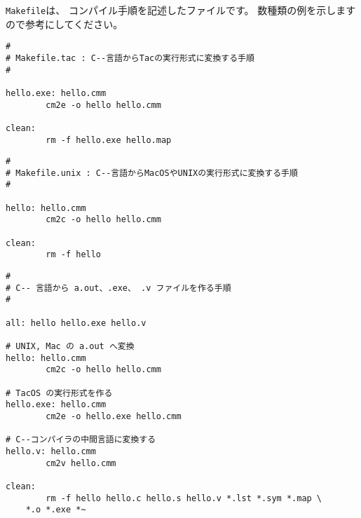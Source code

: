 {\tt Makefile}は、
コンパイル手順を記述したファイルです。
数種類の例を示しますので参考にしてください。

\begin{mylist}
\begin{verbatim}
#
# Makefile.tac : C--言語からTacの実行形式に変換する手順
#

hello.exe: hello.cmm
        cm2e -o hello hello.cmm

clean:
        rm -f hello.exe hello.map
\end{verbatim}
\end{mylist}

\begin{mylist}
\begin{verbatim}
#
# Makefile.unix : C--言語からMacOSやUNIXの実行形式に変換する手順
#

hello: hello.cmm
        cm2c -o hello hello.cmm

clean:
        rm -f hello
\end{verbatim}
\end{mylist}

\begin{mylist}
\begin{verbatim}
#
# C-- 言語から a.out、.exe、 .v ファイルを作る手順
#

all: hello hello.exe hello.v

# UNIX, Mac の a.out へ変換
hello: hello.cmm
        cm2c -o hello hello.cmm

# TacOS の実行形式を作る
hello.exe: hello.cmm
        cm2e -o hello.exe hello.cmm

# C--コンパイラの中間言語に変換する
hello.v: hello.cmm
        cm2v hello.cmm

clean:
        rm -f hello hello.c hello.s hello.v *.lst *.sym *.map \
	*.o *.exe *~

\end{verbatim}
\end{mylist}
